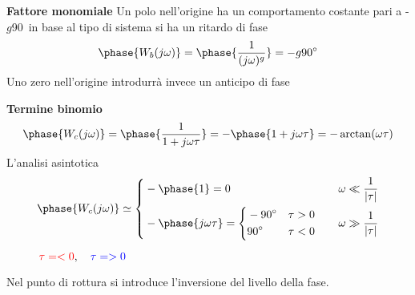 \newpage
\textbf{Fattore monomiale} Un polo nell'origine ha un comportamento costante
pari a -$g$90\textdegree\ in base al tipo di sistema si ha un ritardo di fase
$$
\phase{W_b(j\omega)} = \phase{\frac{1}{(j\omega)^g}} = -g\SI{90}{\degree}
$$
Uno zero nell'origine introdurrà invece un anticipo di fase

\textbf{Termine binomio}
$$
\phase{W_c(j\omega)} = \phase{\frac{1}{1+j\omega \tau}} =
-\phase{1+j\omega\tau} = -\arctan(\omega\tau)
$$
L'analisi asintotica
$$
\phase{W_c(j\omega)} \simeq \left\{
\begin{aligned}
&-\phase{1}= 0 & & & \omega \ll \frac{1}{|\tau|} \\
&-\phase{j\omega\tau} = \left\{
\begin{aligned}
&\SI{-90}{\degree} & &\tau> 0 \\
&\SI{90}{\degree} & & \tau<0
\end{aligned}\right. & & & \omega \gg \frac{1}{|\tau|}
\end{aligned}\right.
$$

\begin{figure}[h]
\centering
{}
\caption{$\textcolor{red}{\tau=<0},\quad
\textcolor{blue}{\tau=>0} $}
\end{figure}
Nel punto di rottura si introduce l'inversione del livello della fase.

